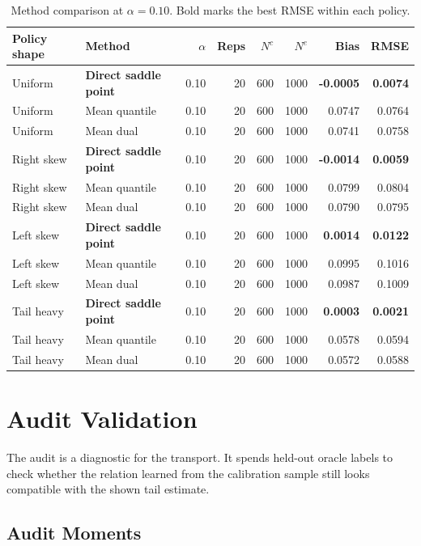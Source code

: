 \documentclass[11pt]{article}
\begin{document}
\begin{table}[H]
\centering
\scriptsize
\begin{tabular}{@{}llrrrrrr@{}}
\toprule
Policy shape & Method & \(\alpha\) & Reps & \(N^c\) & \(N^e\) & Bias & RMSE \\
\midrule
Uniform & \textbf{Direct saddle point} & 0.10 & 20 & 600 & 1000 & \textbf{-0.0005} & \textbf{0.0074} \\
Uniform & Mean quantile & 0.10 & 20 & 600 & 1000 & 0.0747 & 0.0764 \\
Uniform & Mean dual & 0.10 & 20 & 600 & 1000 & 0.0741 & 0.0758 \\
Right skew & \textbf{Direct saddle point} & 0.10 & 20 & 600 & 1000 & \textbf{-0.0014} & \textbf{0.0059} \\
Right skew & Mean quantile & 0.10 & 20 & 600 & 1000 & 0.0799 & 0.0804 \\
Right skew & Mean dual & 0.10 & 20 & 600 & 1000 & 0.0790 & 0.0795 \\
Left skew & \textbf{Direct saddle point} & 0.10 & 20 & 600 & 1000 & \textbf{0.0014} & \textbf{0.0122} \\
Left skew & Mean quantile & 0.10 & 20 & 600 & 1000 & 0.0995 & 0.1016 \\
Left skew & Mean dual & 0.10 & 20 & 600 & 1000 & 0.0987 & 0.1009 \\
Tail heavy & \textbf{Direct saddle point} & 0.10 & 20 & 600 & 1000 & \textbf{0.0003} & \textbf{0.0021} \\
Tail heavy & Mean quantile & 0.10 & 20 & 600 & 1000 & 0.0578 & 0.0594 \\
Tail heavy & Mean dual & 0.10 & 20 & 600 & 1000 & 0.0572 & 0.0588 \\
\bottomrule
\end{tabular}
\caption{Method comparison at \(\alpha=0.10\).  Bold marks the best RMSE within each policy.}
\label{tab-method}
\end{table}

\section{Audit Validation}

The audit is a diagnostic for the transport.  It spends
held-out oracle labels to check whether the relation learned from the
calibration sample still looks compatible with the shown tail estimate.

\subsection{Audit Moments}
\end{document}
